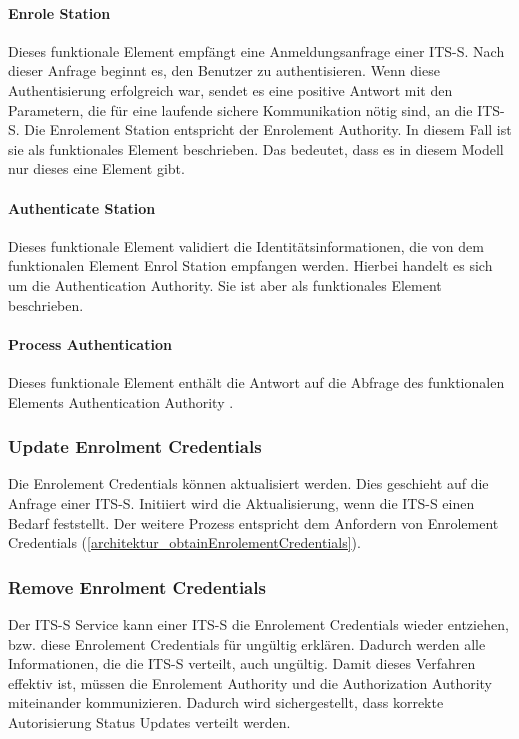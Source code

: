 \paragraph{Enrole Station} Dieses funktionale Element empfängt eine Anmeldungsanfrage einer \ac{ITS-S}. Nach dieser Anfrage beginnt es, den Benutzer zu authentisieren. Wenn diese Authentisierung erfolgreich war, sendet es eine positive Antwort mit den Parametern, die für eine laufende sichere Kommunikation nötig sind, an die \ac{ITS-S}. Die Enrolement Station entspricht der Enrolement Authority. In diesem Fall ist sie als funktionales Element beschrieben. Das bedeutet, dass es in diesem Modell nur dieses eine Element gibt. 

\paragraph{Authenticate Station} Dieses funktionale Element validiert die Identitäts\-informationen, die von dem funktionalen Element Enrol Station empfangen werden. Hierbei handelt es sich um die Authentication Authority. Sie ist aber als funktionales Element beschrieben.

\paragraph{Process Authentication} Dieses funktionale Element enthält die Antwort auf die Abfrage des funktionalen Elements  Authentication Authority .
 
 
\subsubsection{Update Enrolment Credentials}
Die Enrolement Credentials können aktualisiert werden. Dies geschieht auf die Anfrage einer \ac{ITS-S}. Initiiert wird die Aktualisierung, wenn die \ac{ITS-S}  einen Bedarf feststellt. Der weitere Prozess entspricht dem Anfordern von Enrolement Credentials (\autoref{architektur_obtainEnrolementCredentials}).

\subsubsection{Remove Enrolment Credentials}
Der \ac{ITS-S} Service kann einer \ac{ITS-S} die Enrolement Credentials wieder entziehen, bzw. diese Enrolement Credentials für ungültig erklären. Dadurch werden alle Informationen, die die \ac{ITS-S} verteilt, auch ungültig. Damit dieses Verfahren effektiv ist, müssen die Enrolement Authority und die Authorization Authority miteinander kommunizieren. Dadurch wird sichergestellt, dass korrekte Autorisierung Status Updates verteilt werden. 


